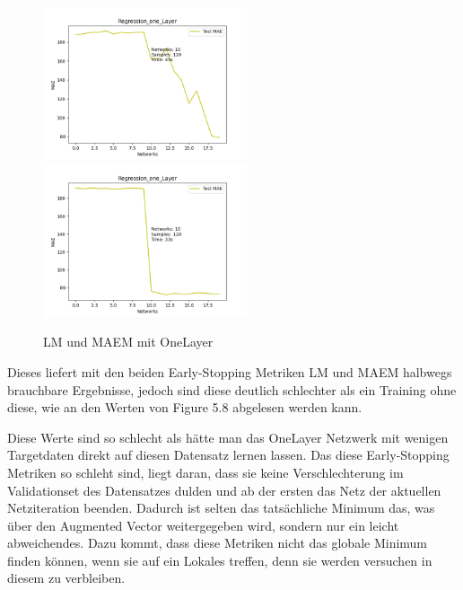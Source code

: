 \begin{figure}[htpb]
    \includegraphics[height=4.5cm]{../../Plots/ba_plots/earlystopping/lossmetric/onelayer_ts.png}
    \includegraphics[height=4.5cm]{../../Plots/ba_plots/earlystopping/intermetric/onelayer_ts.png}
    \caption{\label{fig:onelayermetrics} LM und MAEM mit OneLayer}
\end{figure}

Dieses liefert mit den beiden Early-Stopping Metriken LM und MAEM 
halbwegs brauchbare Ergebnisse, jedoch sind diese deutlich schlechter als ein Training ohne diese, wie an den Werten von Figure 5.8 abgelesen 
werden kann. 

Diese Werte sind so schlecht als hätte man das OneLayer Netzwerk mit wenigen Targetdaten direkt auf diesen Datensatz lernen lassen. 
Das diese Early-Stopping Metriken so schleht sind, liegt daran, dass sie keine Verschlechterung im Validationset des Datensatzes dulden und ab 
der ersten das Netz der aktuellen Netziteration beenden. Dadurch ist selten das tatsächliche Minimum das, was über den Augmented Vector 
weitergegeben wird, sondern nur ein leicht abweichendes. Dazu kommt, dass diese Metriken nicht das globale Minimum finden können, wenn sie 
auf ein Lokales treffen, denn sie werden versuchen in diesem zu verbleiben. 
